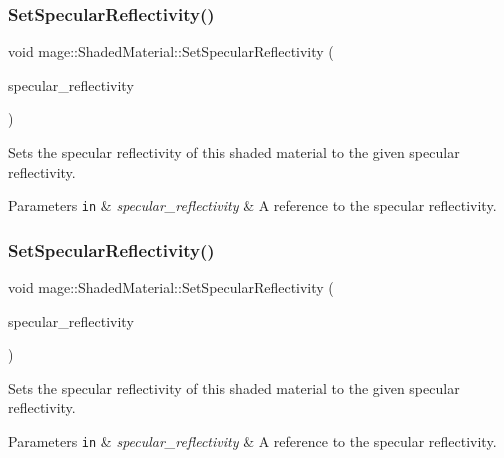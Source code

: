 \subsubsection{\texorpdfstring{Set\+Specular\+Reflectivity()}{SetSpecularReflectivity()}\hspace{0.1cm}{\footnotesize\ttfamily [1/2]}}
{\footnotesize\ttfamily void mage\+::\+Shaded\+Material\+::\+Set\+Specular\+Reflectivity (\begin{DoxyParamCaption}\item[{const \hyperlink{structmage_1_1_r_g_b_spectrum}{R\+G\+B\+Spectrum} \&}]{specular\+\_\+reflectivity }\end{DoxyParamCaption})\hspace{0.3cm}{\ttfamily [noexcept]}}

Sets the specular reflectivity of this shaded material to the given specular reflectivity.


\begin{DoxyParams}[1]{Parameters}
\mbox{\tt in}  & {\em specular\+\_\+reflectivity} & A reference to the specular reflectivity. \\
\hline
\end{DoxyParams}
\hypertarget{structmage_1_1_shaded_material_acfe55ee6398b1255d48d7e72a543f127}{}\label{structmage_1_1_shaded_material_acfe55ee6398b1255d48d7e72a543f127} 
\subsubsection{\texorpdfstring{Set\+Specular\+Reflectivity()}{SetSpecularReflectivity()}\hspace{0.1cm}{\footnotesize\ttfamily [2/2]}}
{\footnotesize\ttfamily void mage\+::\+Shaded\+Material\+::\+Set\+Specular\+Reflectivity (\begin{DoxyParamCaption}\item[{\hyperlink{structmage_1_1_r_g_b_spectrum}{R\+G\+B\+Spectrum} \&\&}]{specular\+\_\+reflectivity }\end{DoxyParamCaption})\hspace{0.3cm}{\ttfamily [noexcept]}}

Sets the specular reflectivity of this shaded material to the given specular reflectivity.


\begin{DoxyParams}[1]{Parameters}
\mbox{\tt in}  & {\em specular\+\_\+reflectivity} & A reference to the specular reflectivity. \\
\hline
\end{DoxyParams}
\hypertarget{structmage_1_1_shaded_material_a8bd9bf0a0b1f636a74d3452c58b5b98d}{}\label{structmage_1_1_shaded_material_a8bd9bf0a0b1f636a74d3452c58b5b98d} 
